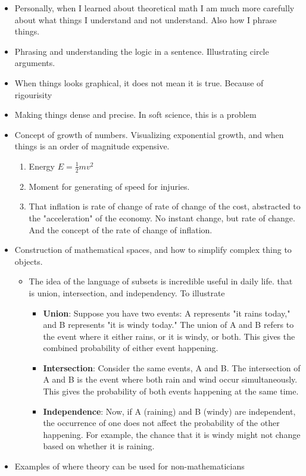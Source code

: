 \documentclass[10pt,conference]{IEEEtran}
\begin{document}
\begin{sloppy}
\begin{itemize}
    \item Personally, when I learned about theoretical math I am much more carefully about what things I understand and not understand. Also how I phrase things.
    \item Phrasing and understanding the logic in a sentence. Illustrating circle arguments.
    \item When things looks graphical, it does not mean it is true. Because of rigourisity
    \item Making things dense and precise. In soft science, this is a problem
    \item Concept of growth of numbers. Visualizing exponential growth, and when things is an order of magnitude expensive.
        \begin{enumerate}[label=\arabic*)]
            \item Energy $E = \frac{1}{2}mv^2$
            \item Moment for generating of speed for injuries.
            \item That inflation is rate of change of rate of change of the cost, abstracted to the "acceleration" of the economy. No instant change, but rate of change. And the concept of the rate of change of inflation.
        \end{enumerate}
    \item Construction of mathematical spaces, and how to simplify complex thing to objects.
        \begin{itemize}
            \item The idea of the language of subsets is incredible useful in daily life. that is union, intersection, and independency. To illustrate
\begin{itemize}
    \item \textbf{Union}: Suppose you have two events: A represents "it rains today," and B represents "it is windy today." The union of A and B refers to the event where it either rains, or it is windy, or both. This gives the combined probability of either event happening.
    \item \textbf{Intersection}: Consider the same events, A and B. The intersection of A and B is the event where both rain and wind occur simultaneously. This gives the probability of both events happening at the same time.
    \item \textbf{Independence}: Now, if A (raining) and B (windy) are independent, the occurrence of one does not affect the probability of the other happening. For example, the chance that it is windy might not change based on whether it is raining.
\end{itemize}
        \end{itemize}
    \item Examples of where theory can be used for non-mathematicians


\end{itemize}
\end{sloppy}
\end{document}
